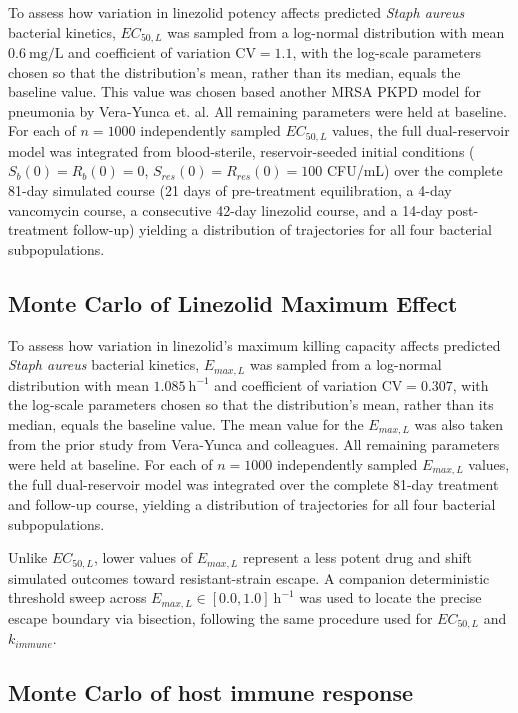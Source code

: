 \documentclass[12pt, draftcls, onecolumn]{IEEEtran}
\begin{document}
To assess how variation in linezolid potency affects predicted
\textit{Staph aureus} bacterial kinetics, $EC_{50,L}$ was sampled from
a log-normal distribution with mean $0.6~\mathrm{mg/L}$ and coefficient
of variation $\mathrm{CV} = 1.1$, with the log-scale parameters
chosen so that the distribution's mean, rather than its median, equals
the baseline value. This value was chosen based another MRSA PKPD model for pneumonia by Vera-Yunca et. al. All remaining parameters were held at baseline.
For each of $n = 1000$ independently sampled $EC_{50,L}$ values, the
full dual-reservoir model was integrated from blood-sterile, reservoir-seeded
initial conditions ($S_b(0){=}R_b(0){=}0$, $S_{res}(0){=}R_{res}(0){=}100$
CFU/mL) over the complete 81-day simulated course (21 days of
pre-treatment equilibration, a 4-day vancomycin course, a consecutive
42-day linezolid course, and a 14-day post-treatment follow-up)
yielding a distribution of trajectories for all four bacterial
subpopulations.

\subsection{Monte Carlo of Linezolid Maximum Effect}

To assess how variation in linezolid's maximum killing capacity affects
predicted \textit{Staph aureus} bacterial kinetics, $E_{max,L}$ was sampled
from a log-normal distribution with mean $1.085~\mathrm{h}^{-1}$ and
coefficient of variation $\mathrm{CV} = 0.307$, with the log-scale
parameters chosen so that the distribution's mean, rather than its median,
equals the baseline value. The mean value for the $E_{max, L}$ was also taken from the prior study from Vera-Yunca and colleagues.  All remaining parameters were held at baseline.
For each of $n = 1000$ independently sampled $E_{max,L}$ values, the full
dual-reservoir model was integrated over the complete 81-day treatment and
follow-up course, yielding a distribution of trajectories for all four
bacterial subpopulations.

Unlike $EC_{50,L}$, lower values of $E_{max,L}$ represent a less potent
drug and shift simulated outcomes toward resistant-strain escape. A
companion deterministic threshold sweep across $E_{max,L} \in
[0.0, 1.0]~\mathrm{h}^{-1}$ was used to locate the precise escape boundary
via bisection, following the same procedure used for $EC_{50,L}$ and
$k_{immune}$.

\subsection{Monte Carlo of host immune response}
\end{document}
